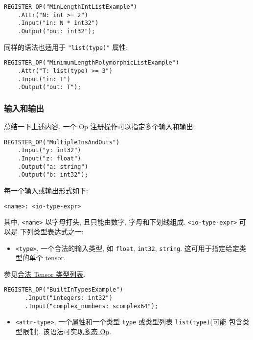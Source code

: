 \begin{verbatim}
REGISTER_OP("MinLengthIntListExample")
    .Attr("N: int >= 2")
    .Input("in: N * int32")
    .Output("out: int32");
\end{verbatim}

同样的语法也适用于 \texttt{"list(type)"} 属性:

\begin{verbatim}
REGISTER_OP("MinimumLengthPolymorphicListExample")
    .Attr("T: list(type) >= 3")
    .Input("in: T")
    .Output("out: T");
\end{verbatim}

\subsubsection{输入和输出 }\label{ux8f93ux5165ux548cux8f93ux51fa}

总结一下上述内容, 一个 Op 注册操作可以指定多个输入和输出:

\begin{verbatim}
REGISTER_OP("MultipleInsAndOuts")
    .Input("y: int32")
    .Input("z: float")
    .Output("a: string")
    .Output("b: int32");
\end{verbatim}

每一个输入或输出形式如下:

\begin{verbatim}
<name>: <io-type-expr>
\end{verbatim}

其中, \texttt{\textless{}name\textgreater{}} 以字母打头, 且只能由数字,
字母和下划线组成. \texttt{\textless{}io-type-expr\textgreater{}} 可以是
下列类型表达式之一:

\begin{itemize}
\tightlist
\item
  \texttt{\textless{}type\textgreater{}}, 一个合法的输入类型, 如
  \texttt{float}, \texttt{int32}, \texttt{string}.
  这可用于指定给定类型的单个 tensor.
\end{itemize}

参见\href{tensorflow-zh/SOURCE/resources/dims_types.md\#data-types}{合法
Tensor 类型列表}.

\begin{verbatim}
REGISTER_OP("BuiltInTypesExample")
      .Input("integers: int32")
      .Input("complex_numbers: scomplex64");
\end{verbatim}

\begin{itemize}
\tightlist
\item
  \texttt{\textless{}attr-type\textgreater{}},
  一个\protect\hyperlink{attrs}{属性}和一个类型 \texttt{type} 或类型列表
  \texttt{list(type)}(可能 包含类型限制).
  该语法可实现\protect\hyperlink{Polymorphism}{多态 Op}.
\end{itemize}

